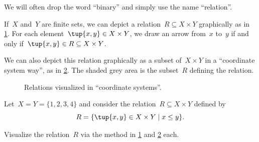 \begin{remark}
    We will often drop the word ``binary'' and simply use the name ``relation''.
\end{remark}


If~$X$ and~$Y$ are finite sets, we can depict a relation~$R \subseteq X \times Y$ graphically as in \cref{fig:example_rel}. For each element~$\tup{x,y} \in X \times Y$, we draw an arrow from~$x$ to~$y$ if and only if~$\tup{x,y} \in R \subseteq X \times Y$.

\begin{figure}[h!]
    \centering
    \caption{\label{fig:example_rel}}
\end{figure}

We can also depict this relation graphically as a subset of~$X \times Y$ in a ``coordinate system way'', as in \cref{fig:example_rel_coord}. The shaded grey area is the subset~$R$ defining the relation.

\begin{figure}[h!]
    \begin{center}
    \end{center}
    \caption{Relations visualized in ``coordinate systems''.}
    \label{fig:example_rel_coord}
\end{figure}

\begin{exercise}
    Let~$X = Y = \{1, 2, 3, 4 \}$ and consider the relation~$R \subseteq X \times Y$ defined by
    \begin{equation}
        R = \{ \tup{x,y} \in X \times Y \mid x \leq y \}.
    \end{equation}

    Visualize the relation~$R$ via the method in \cref{fig:example_rel} and \cref{fig:example_rel_coord} each.
\end{exercise}

